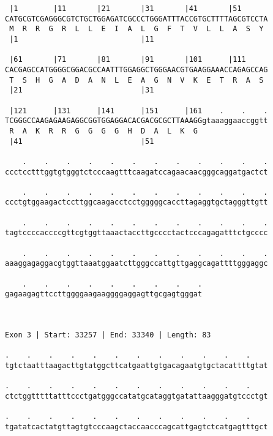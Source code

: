 \documentclass{article}
\begin{document}
\begin{Verbatim}
 |1        |11       |21       |31       |41       |51      
CATGCGTCGAGGGCGTCTGCTGGAGATCGCCCTGGGATTTACCGTGCTTTTAGCGTCCTA
 M  R  R  G  R  L  L  E  I  A  L  G  F  T  V  L  L  A  S  Y 
 |1                            |11                          
  
 |61       |71       |81       |91       |101      |111     
CACGAGCCATGGGGCGGACGCCAATTTGGAGGCTGGGAACGTGAAGGAAACCAGAGCCAG
 T  S  H  G  A  D  A  N  L  E  A  G  N  V  K  E  T  R  A  S 
 |21                           |31                          
  
 |121      |131      |141      |151      |161    .    .    .
TCGGGCCAAGAGAAGAGGCGGTGGAGGACACGACGCGCTTAAAGGgtaaaggaaccggtt
 R  A  K  R  R  G  G  G  G  H  D  A  L  K  G                
 |41                           |51                          
  
    .    .    .    .    .    .    .    .    .    .    .    .
ccctcctttggtgtgggtctcccaagtttcaagatccagaacaacgggcaggatgactct
                                                            
    .    .    .    .    .    .    .    .    .    .    .    .
ccctgtggaagactccttggcaagacctcctgggggcaccttagaggtgctagggttgtt
                                                            
    .    .    .    .    .    .    .    .    .    .    .    .
tagtccccaccccgttcgtggttaaactaccttgcccctactcccagagatttctgcccc
                                                            
    .    .    .    .    .    .    .    .    .    .    .    .
aaaggagaggacgtggttaaatggaatcttgggccattgttgaggcagattttgggaggc
                                                            
    .    .    .    .    .    .    .    .    .
gagaagagttccttggggaagaaggggaggagttgcgagtgggat
                                             
                                             
 
Exon 3 | Start: 33257 | End: 33340 | Length: 83
 
.    .    .    .    .    .    .    .    .    .    .    .    
tgtctaatttaagacttgtatggcttcatgaattgtgacagaatgtgctacattttgtat
                                                            
.    .    .    .    .    .    .    .    .    .    .    .    
ctctggtttttatttccctgatgggccatatgcataggtgatattaagggatgtccctgt
                                                            
.    .    .    .    .    .    .    .    .    .    .    .    
tgatatcactatgttagtgtcccaagctaccaacccagcattgagtctcatgagtttgct
                                                            

\end{Verbatim}
\end{document}
